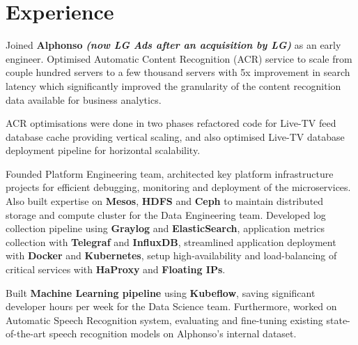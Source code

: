 \documentclass[]{deedy-resume-openfont}
\begin{document}
\begin{minipage}[t]{0.66\textwidth} 


\section{Experience}
\vspace{\topsep} %
\begin{tightemize}
\item Joined \textbf{Alphonso} {\footnotesize \textit{\textbf{(now LG Ads after an acquisition by LG) }}} as an early engineer. Optimised Automatic Content Recognition (ACR) service to scale from couple hundred servers to a few thousand servers with 5x improvement in search latency which significantly improved the granularity of the content recognition data available for business analytics.
\item ACR optimisations were done in two phases \textemdash refactored code for Live-TV feed database cache providing vertical scaling, and also optimised Live-TV database deployment pipeline for horizontal scalability.   
\item Founded Platform Engineering team, architected key platform infrastructure projects for efficient debugging, monitoring and deployment of the microservices. Also built expertise on \textbf{Mesos}, \textbf{HDFS} and \textbf{Ceph} to maintain distributed storage and compute cluster for the Data Engineering team. Developed log collection pipeline using \textbf{Graylog} and \textbf{ElasticSearch}, application metrics collection with \textbf{Telegraf} and \textbf{InfluxDB}, streamlined application deployment with \textbf{Docker} and \textbf{Kubernetes}, setup high-availability and load-balancing of critical services with \textbf{HaProxy} and \textbf{Floating IPs}.
\item Built \textbf{Machine Learning pipeline} using \textbf{Kubeflow}, saving significant developer hours per week for the Data Science team. Furthermore, worked on Automatic Speech Recognition system, evaluating and fine-tuning existing
state-of-the-art speech recognition models on Alphonso's internal dataset.
\end{tightemize}
\sectionsep


\end{minipage}
\end{document}
